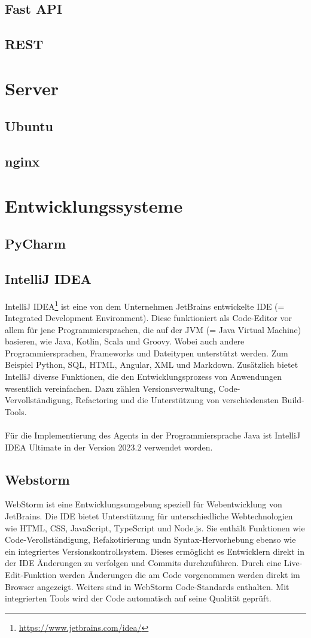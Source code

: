 \documentclass{report}
\begin{document}
\subsection{Fast API}
\subsection{REST}

\section{Server}
\subsection{Ubuntu}
\subsection{nginx}

\section{Entwicklungssysteme}
\subsection{PyCharm}
\subsection{IntelliJ IDEA}
IntelliJ IDEA\footnote{\url{https://www.jetbrains.com/idea/}} ist eine von dem Unternehmen JetBrains entwickelte IDE (= Integrated Development Environment). Diese funktioniert als Code-Editor vor allem für jene Programmiersprachen, die auf der JVM (= Java Virtual Machine) basieren, wie Java, Kotlin, Scala und Groovy. Wobei auch andere Programmiersprachen, Frameworks und Dateitypen unterstützt werden. Zum Beispiel Python, SQL, HTML, Angular, XML und Markdown. Zusätzlich bietet IntelliJ diverse Funktionen, die den Entwicklungsprozess von Anwendungen wesentlich vereinfachen. Dazu zählen Versionsverwaltung, Code-Vervollständigung, Refactoring und die Unterstützung von verschiedensten Build-Tools.\\\\
Für die Implementierung des Agents in der Programmiersprache Java ist IntelliJ IDEA Ultimate in der Version 2023.2 verwendet worden.

\subsection{Webstorm}
WebStorm ist eine Entwicklungsumgebung speziell für Webentwicklung von JetBrains. Die IDE bietet Unterstützung für unterschiedliche Webtechnologien wie HTML, CSS, JavaScript, TypeScript und Node.js. Sie enthält Funktionen wie Code-Verollständigung, Refakotirierung undn Syntax-Hervorhebung ebenso wie ein integriertes Versionskontrollsystem. Dieses ermöglicht es Entwicklern direkt in der IDE Änderungen zu verfolgen und Commits durchzuführen. Durch eine Live-Edit-Funktion werden Änderungen die am Code vorgenommen werden direkt im Browser angezeigt. Weiters sind in WebStorm Code-Standards enthalten. Mit integrierten Tools wird der Code automatisch auf seine Qualität geprüft.
\end{document}
